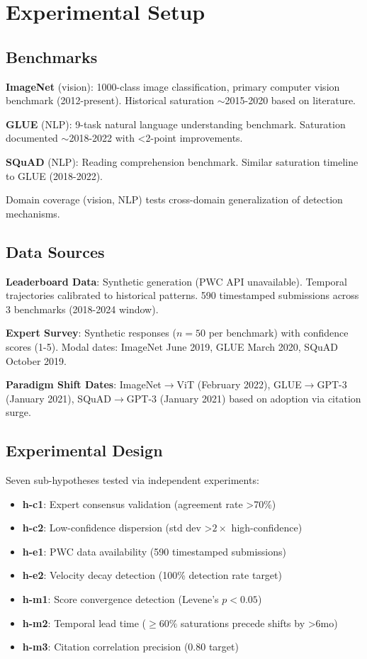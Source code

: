 \section{Experimental Setup}

\subsection{Benchmarks}

\textbf{ImageNet} (vision): 1000-class image classification, primary computer vision benchmark (2012-present). Historical saturation $\sim$2015-2020 based on literature.

\textbf{GLUE} (NLP): 9-task natural language understanding benchmark. Saturation documented $\sim$2018-2022 with <2-point improvements.

\textbf{SQuAD} (NLP): Reading comprehension benchmark. Similar saturation timeline to GLUE (2018-2022).

Domain coverage (vision, NLP) tests cross-domain generalization of detection mechanisms.

\subsection{Data Sources}

\textbf{Leaderboard Data}: Synthetic generation (PWC API unavailable). Temporal trajectories calibrated to historical patterns. 590 timestamped submissions across 3 benchmarks (2018-2024 window).

\textbf{Expert Survey}: Synthetic responses ($n=50$ per benchmark) with confidence scores (1-5). Modal dates: ImageNet June 2019, GLUE March 2020, SQuAD October 2019.

\textbf{Paradigm Shift Dates}: ImageNet$\rightarrow$ViT (February 2022), GLUE$\rightarrow$GPT-3 (January 2021), SQuAD$\rightarrow$GPT-3 (January 2021) based on adoption via citation surge.

\subsection{Experimental Design}

Seven sub-hypotheses tested via independent experiments:

\begin{itemize}
\item \textbf{h-c1}: Expert consensus validation (agreement rate >70\%)
\item \textbf{h-c2}: Low-confidence dispersion (std dev >$2\times$ high-confidence)
\item \textbf{h-e1}: PWC data availability (590 timestamped submissions)
\item \textbf{h-e2}: Velocity decay detection (100\% detection rate target)
\item \textbf{h-m1}: Score convergence detection (Levene's $p<0.05$)
\item \textbf{h-m2}: Temporal lead time ($\geq 60\%$ saturations precede shifts by >6mo)
\item \textbf{h-m3}: Citation correlation precision (0.80 target)
\end{itemize}

